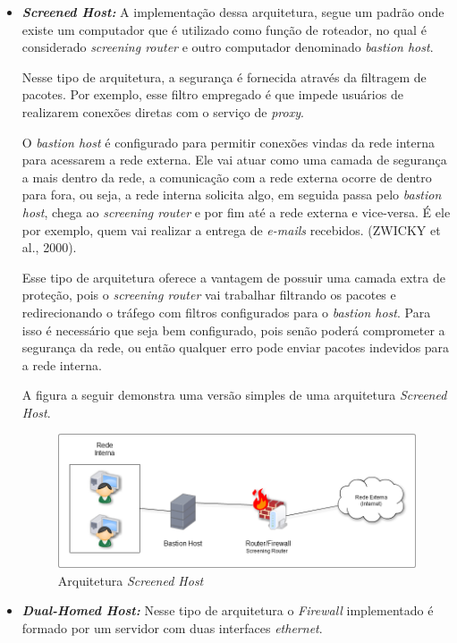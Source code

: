 \begin{itemize}
\item \textbf{\textit{Screened Host:}} A implementação dessa arquitetura, segue um padrão onde existe um computador que é utilizado como função de roteador, no qual é considerado \textit{screening router} e outro computador denominado \textit{bastion host}.

Nesse tipo de arquitetura, a segurança é fornecida através da filtragem de pacotes. Por exemplo, esse filtro empregado é que impede usuários de realizarem conexões diretas com o serviço de \textit{proxy}.

O \textit{bastion host} é configurado para permitir conexões vindas da rede interna para acessarem a rede externa. Ele vai atuar como uma camada de segurança a mais dentro da rede, a comunicação com a rede externa ocorre de dentro para fora, ou seja, a rede interna solicita algo, em seguida passa pelo \textit{bastion host}, chega ao \textit{screening router} e por fim até a rede externa e vice-versa. É ele por exemplo, quem vai realizar a entrega de \textit{e-mails} recebidos. (ZWICKY et al., 2000).

Esse tipo de arquitetura oferece a vantagem de possuir uma camada extra de proteção, pois o \textit{screening router} vai trabalhar filtrando os pacotes e redirecionando o tráfego com filtros configurados para o \textit{bastion host}. Para isso é necessário que seja bem configurado, pois senão poderá comprometer a segurança da rede, ou então qualquer erro pode enviar pacotes indevidos para a rede interna. 

A figura a seguir demonstra uma versão simples de uma arquitetura \textit{Screened Host}.

\begin{figure}[!h]
\centering
\includegraphics[width = 15cm]{ScreenedHost.png}
\caption{Arquitetura \textit{Screened Host}} 	
\end{figure}

\item \textbf{\textit{Dual-Homed Host:}} Nesse tipo de arquitetura o \textit{Firewall} implementado é formado por um servidor com duas interfaces \textit{ethernet}.


\end{itemize}

